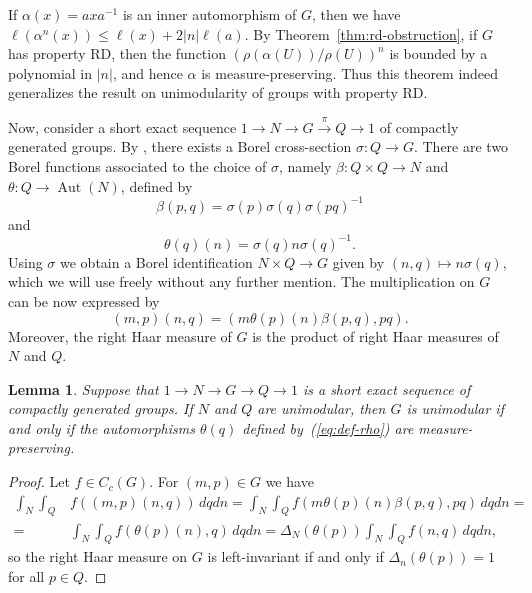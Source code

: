 \documentclass{amsart}
\newtheorem{lemma}[theorem]{Lemma}
\theoremstyle{definition}
\theoremstyle{remark}
\begin{document}
If $\alpha(x)=axa^{-1}$ is an inner automorphism of $G$, then we have
$\ell(\alpha^n(x)) \leq \ell(x)+2{\left\lvert{n}\right\rvert}\ell(a)$. By
Theorem~\ref{thm:rd-obstruction}, if $G$ has property RD, then the
function $(\rho(\alpha(U))/\rho(U))^n$ is bounded by a polynomial in
$\lvert n\rvert$, and hence $\alpha$ is measure-preserving. Thus this
theorem indeed generalizes the result on unimodularity of groups with
property RD.

Now, consider a short exact sequence 
 $1\to N\to G\overset{\pi}{\to} Q\to 1$ of compactly generated groups. By \cite[Lemma
1.1]{Mackey1952}, there exists a Borel cross-section $\sigma\colon
Q\to G$. There are two Borel functions associated to the choice of
$\sigma$, namely $\beta\colon Q\times Q\to N$ and $\theta\colon
Q\to\operatorname{Aut}(N)$, defined by
\begin{equation}
  \label{eq:def-f}
  \beta(p,q)=\sigma(p)\sigma(q)\sigma(pq)^{-1}  
\end{equation}
and
\begin{equation}
  \label{eq:def-rho}
  \theta(q)(n)=\sigma(q)n\sigma(q)^{-1}.  
\end{equation}
Using $\sigma$ we obtain a Borel identification $N\times Q\to G$ given by
$(n,q)\mapsto n\sigma(q)$, which we will use freely without any further
mention. The multiplication on $G$ can be now expressed by
\begin{equation}
  \label{eq:def-mult-ext}
  (m,p)(n,q)=(m\theta(p)(n)\beta(p,q),pq).  
\end{equation}
Moreover, the right Haar measure of $G$ is the product of right Haar
measures of $N$ and $Q$.

\begin{lemma}
  \label{thm:unimodularity-conditions}
  Suppose that $1\to N\to G \to Q\to 1$ is a short exact sequence of
  compactly generated groups. If $N$ and $Q$ are unimodular, then $G$
  is unimodular if and only if the automorphisms $\theta(q)$ defined
  by~(\ref{eq:def-rho}) are measure-preserving.
\end{lemma}

\begin{proof}
  Let $f\in C_c(G)$. For $(m,p)\in G$ we have
  \begin{equation}
    \begin{split}
      \int_N\int_Q & f((m,p)(n,q))\,dqdn = \int_N\int_Q f
      (m\theta(p)(n)\beta(p,q),pq)\,dqdn = \\
      = & \int_N\int_Q f(\theta(p)(n),q)\,dqdn =
      \Delta_N(\theta(p))\int_N\int_Q f(n,q)\,dqdn,
    \end{split}
  \end{equation}
  so the right Haar measure on $G$ is left-invariant if and only if
  $\Delta_n(\theta(p))=1$ for all $p\in Q$.
\end{proof}
\end{document}
